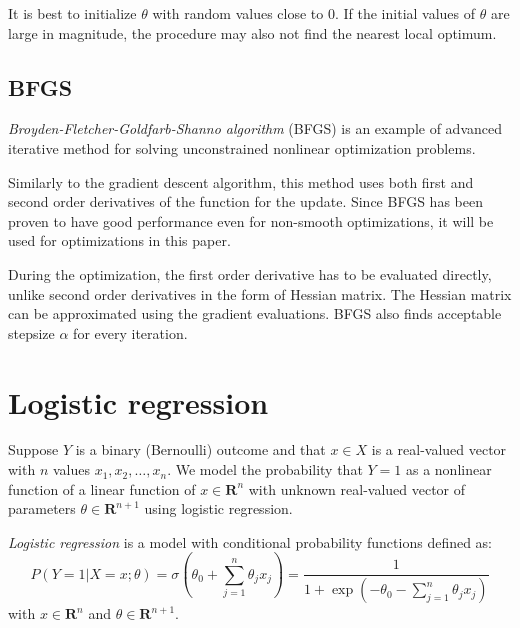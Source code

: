 \documentclass[times, utf8, zavrsni]{fer}
\begin{document}
It is best to initialize $\theta$ with random values  close to $0$. If the initial values of $\theta$ are large in magnitude, the procedure may also not find the nearest local optimum.
    
\subsection{BFGS}
\emph{Broyden-Fletcher-Goldfarb-Shanno algorithm} (BFGS) is an example of advanced iterative method for solving unconstrained nonlinear optimization problems. 

Similarly to the gradient descent algorithm, this method uses both first and second order  derivatives of the function for the update. Since BFGS has been proven to have good performance even for non-smooth optimizations, it will be used for optimizations in this paper. 

During the optimization, the first order derivative has to be evaluated directly, unlike second order derivatives in the form of Hessian matrix. The Hessian matrix can be approximated using the gradient evaluations. BFGS also finds acceptable stepsize $\alpha$  for every iteration.

\section{Logistic regression}
Suppose $Y$ is a binary (Bernoulli) outcome and that $x \in X$ is a  real-valued vector with $n$ values $x_1, x_2, \dots, x_n$. We model the probability that $Y = 1$ as a nonlinear function of a linear function of $x \in \mathbf{R}^n$ with unknown real-valued vector of parameters $\theta \in \mathbf{R}^{n + 1}$ using logistic regression.

\emph{Logistic regression} is a model with conditional probability functions defined as:
\begin{equation}
\label{reg}
	P(Y = 1 | X = x; \theta) = \sigma(\theta_0 + \sum_{j = 1}^{n} \theta_j  x_j) = \frac{1}{1 + \exp(-\theta_0 - \sum_{j = 1}^{n} \theta_j  x_j)}
\end{equation}
with $x \in \mathbf{R}^n$ and $\theta \in \mathbf{R}^{n + 1}$.
\end{document}
